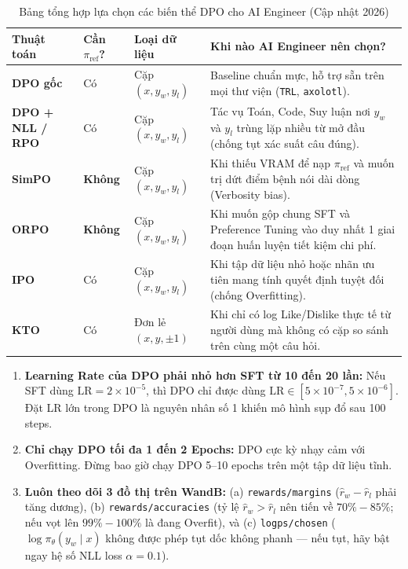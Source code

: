\begin{table}[htbp]
\centering
\caption{Bảng tổng hợp lựa chọn các biến thể DPO cho AI Engineer (Cập nhật 2026)}
\label{tab:dpo_variants_summary}
\renewcommand{\arraystretch}{1.35}
\small
\begin{tabularx}{\textwidth}{l l l X}
\toprule
\textbf{Thuật toán} & \textbf{Cần $\pi_{\text{ref}}$?} & \textbf{Loại dữ liệu} & \textbf{Khi nào AI Engineer nên chọn?} \\
\midrule
\textbf{DPO gốc} \citep{rafailov2023direct} & Có & Cặp $(x, y_w, y_l)$ & Baseline chuẩn mực, hỗ trợ sẵn trên mọi thư viện (\texttt{TRL}, \texttt{axolotl}). \\
\textbf{DPO + NLL / RPO} \citep{pang2024iterative} & Có & Cặp $(x, y_w, y_l)$ & Tác vụ Toán, Code, Suy luận nơi $y_w$ và $y_l$ trùng lặp nhiều từ mở đầu (chống tụt xác suất câu đúng). \\
\textbf{SimPO} \citep{meng2024simpo} & \textbf{Không} & Cặp $(x, y_w, y_l)$ & Khi thiếu VRAM để nạp $\pi_{\text{ref}}$ và muốn trị dứt điểm bệnh nói dài dòng (Verbosity bias). \\
\textbf{ORPO} \citep{hong2024orpo} & \textbf{Không} & Cặp $(x, y_w, y_l)$ & Khi muốn gộp chung SFT và Preference Tuning vào duy nhất 1 giai đoạn huấn luyện tiết kiệm chi phí. \\
\textbf{IPO} \citep{azar2024general} & Có & Cặp $(x, y_w, y_l)$ & Khi tập dữ liệu nhỏ hoặc nhãn ưu tiên mang tính quyết định tuyệt đối (chống Overfitting). \\
\textbf{KTO} \citep{ethayarajh2024kto} & Có & Đơn lẻ $(x, y, \pm 1)$ & Khi chỉ có log Like/Dislike thực tế từ người dùng mà không có cặp so sánh trên cùng một câu hỏi. \\
\bottomrule
\end{tabularx}
\end{table}

\begin{engtakeaway}
\begin{enumerate}
  \item \textbf{Learning Rate của DPO phải nhỏ hơn SFT từ 10 đến 20 lần:} Nếu SFT dùng $\text{LR} = 2 \times 10^{-5}$, thì DPO chỉ được dùng $\text{LR} \in [5 \times 10^{-7}, 5 \times 10^{-6}]$. Đặt LR lớn trong DPO là nguyên nhân số 1 khiến mô hình sụp đổ sau 100 steps.
  \item \textbf{Chỉ chạy DPO tối đa 1 đến 2 Epochs:} DPO cực kỳ nhạy cảm với Overfitting. Đừng bao giờ chạy DPO 5--10 epochs trên một tập dữ liệu tĩnh.
  \item \textbf{Luôn theo dõi 3 đồ thị trên WandB:} (a) \texttt{rewards/margins} ($\hat{r}_w - \hat{r}_l$ phải tăng dương), (b) \texttt{rewards/accuracies} (tỷ lệ $\hat{r}_w > \hat{r}_l$ nên tiến về $70\% - 85\%$; nếu vọt lên $99\% - 100\%$ là đang Overfit), và (c) \texttt{logps/chosen} ($\log \pi_\theta(y_w \mid x)$ không được phép tụt dốc không phanh --- nếu tụt, hãy bật ngay hệ số NLL loss $\alpha = 0.1$).
\end{enumerate}
\end{engtakeaway}
